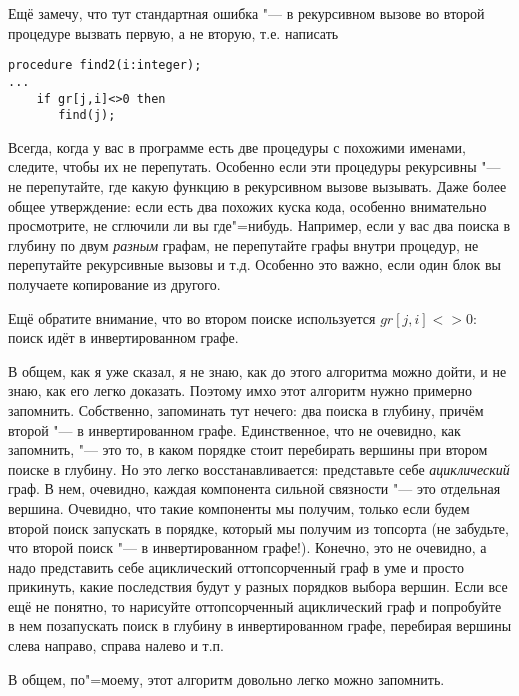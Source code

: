 Ещё замечу, что тут стандартная ошибка "--- в рекурсивном вызове во второй процедуре вызвать первую, а не вторую,
 т.е. написать
\begin{codesampleo}\begin{verbatim}
procedure find2(i:integer);
...
    if gr[j,i]<>0 then
       find(j);
\end{verbatim}\end{codesampleo}
Всегда, когда у вас в программе есть две процедуры с похожими именами, следите, чтобы их не перепутать. Особенно если эти процедуры рекурсивны "--- не перепутайте, где какую функцию в рекурсивном вызове вызывать. Даже более общее утверждение: 
если есть два похожих куска кода, особенно внимательно просмотрите, не сглючили ли вы где"=нибудь. Например, если
у вас два поиска в глубину по двум \textit{разным} графам, не перепутайте графы внутри процедур, не перепутайте рекурсивные
вызовы и т.д. Особенно это важно, если один блок вы получаете копирование из другого.

Ещё обратите внимание, что во втором поиске используется $gr[j,i]<>0$: поиск идёт в инвертированном графе.

В общем, как я уже сказал, я не знаю, как до этого алгоритма можно дойти, и не знаю, как его легко доказать. Поэтому
имхо этот алгоритм нужно примерно запомнить. Собственно, запоминать тут нечего: два поиска в глубину, причём второй
"--- в инвертированном графе. Единственное, что не очевидно, как запомнить, "--- это то, в каком порядке стоит перебирать
вершины при втором поиске в глубину. Но это легко восстанавливается: представьте себе \textit{ациклический} граф.
В нем, очевидно, каждая компонента сильной связности "--- это отдельная вершина. Очевидно, что такие компоненты
мы получим, только если будем второй поиск запускать в порядке, который мы получим из топсорта (не забудьте, что 
второй поиск "--- в инвертированном графе!). Конечно, это не очевидно, а надо представить себе ациклический 
оттопсорченный граф в уме и просто прикинуть, какие последствия будут у разных порядков выбора вершин. Если все ещё 
не понятно, то нарисуйте оттопсорченный ациклический граф и попробуйте в нем позапускать поиск в глубину в инвертированном
графе, перебирая вершины слева направо, справа налево и т.п. 

В общем, по"=моему, этот алгоритм довольно легко можно запомнить.


